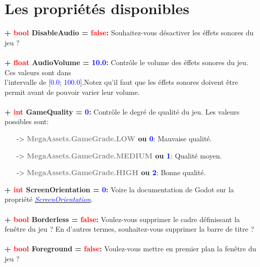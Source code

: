 \documentclass[a4paper, 11pt]{article}
\begin{document}
	\section{Les propriétés disponibles}
	\textbf{+ \textcolor{red}{bool} DisableAudio = \textcolor{red}{false}:} Souhaitez-vous désactiver les
	éffets sonores du jeu ?\\\\
	\textbf{+ \textcolor{red}{float} AudioVolume = \textcolor{blue}{10.0}:} Contrôle le volume des éffets 
	sonores du jeu. Ces valeurs sont dans \\l'intervalle de [\textcolor{blue}{0.0}; \textcolor{blue}
	{100.0}].Notez qu'il faut que les éffets sonores doivent être permit avant de pouvoir varier leur 
	volume.\\\\
	\textbf{+ \textcolor{red}{int} GameQuality = \textcolor{blue}{0}:} Contrôle le degré de qualité du jeu.
	Les valeurs possibles sont:
	\begin{itemize}
		\item [-> \textbf{\textcolor{gray}{MegaAssets.GameGrade.LOW} ou \textcolor{blue}{0}}:] Mauvaise 
		qualité.
		\item [-> \textbf{\textcolor{gray}{MegaAssets.GameGrade.MEDIUM} ou \textcolor{blue}{1}}:] Qualité 
		moyen.
		\item [-> \textbf{\textcolor{gray}{MegaAssets.GameGrade.HIGH} ou \textcolor{blue}{2}}:] Bonne 
		qualité.\\
	\end{itemize}
	\textbf{+ \textcolor{red}{int} ScreenOrientation = \textcolor{blue}{0}:} Voire la documentation de Godot 
	sur la propriété
	\href{https://docs.godotengine.org/en/stable/classes/class_os.html#class-os-property-screen-orientation}
	{\textit{\textcolor{blue}{ScreenOrientation}}}.\\\\
	\textbf{+ \textcolor{red}{bool} Borderless = \textcolor{red}{false}:} Voulez-vous supprimer le cadre 
	définissant la fenêtre du jeu ? En d'autres termes, souhaitez-vous supprimer la barre de titre ?\\\\
	\textbf{+ \textcolor{red}{bool} Foreground = \textcolor{red}{false}:} Voulez-vous mettre en premier plan 
	la fenêtre du jeu ?\\\\
\end{document}
